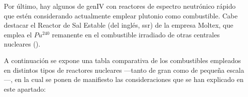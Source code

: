 Por último, hay algunos  de \acrshort{genIV} con reactores de espectro neutrónico rápido que estén considerando actualmente emplear plutonio como combustible. Cabe destacar el Reactor de Sal Estable (del inglés, \acrshort{ssr}) de la empresa Moltex, que emplea el $Pu^{240}$ remanente en el combustible irradiado de otras centrales nucleares (\cite{nea_smrs_2021}).

A continuación se expone una tabla comparativa de los combustibles empleados en distintos tipos de reactores nucleares ---tanto de gran como de pequeña escala---, en la cual se ponen de manifiesto las consideraciones que se han explicado en este apartado:

\begin{table}[h]
  \centering
\end{table}
